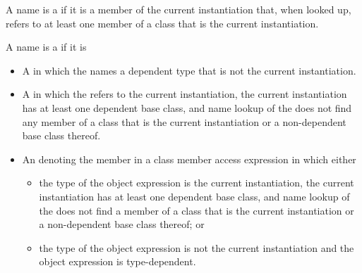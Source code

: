 %
A name is a  if it is a
member of the current instantiation that, when looked up, refers to at least
one member of a class that is the current instantiation.

\pnum
A name is a
if it is

\begin{itemize}
\item
A
in which the
names a dependent type that is not the current instantiation.

\item A  in which the 
refers to the current instantiation, the current instantiation has at least one
dependent base class, and name lookup of the  does not
find any member of a class that is the current instantiation or a non-dependent
base class thereof.

\item An  denoting the member in a class member access
expression in which either
\begin{itemize}
\item the type of the object expression is the current instantiation, the
current instantiation has at least one dependent base class, and name lookup
of the  does not find a member of a class that is
the current instantiation or a non-dependent base class thereof; or

\item the type of the object expression is not the current instantiation
and the object expression is type-dependent.
\end{itemize}
\end{itemize}

